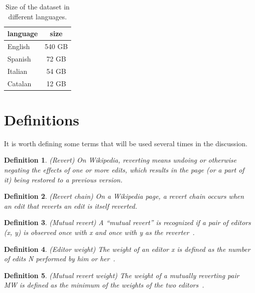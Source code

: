 \begin{table}[H]
    \centering
    \begin{tabularx}{\columnwidth}{@{}Xc@{}}
        \midrule
        \textbf{language} & \textbf{size}\\ \toprule
        English & 540 GB \\
        Spanish & 72 GB \\
        Italian & 54 GB \\
        Catalan & 12 GB \\

         \bottomrule
    \end{tabularx}
    
    \caption{Size of the dataset in different languages. \label{table:datasetsize}}
\end{table}

\section{Definitions}
It is worth defining some terms that will be used several times in the discussion.
\newtheorem{Definition}{Definition}
\begin{Definition}
    (Revert) On Wikipedia, reverting means undoing or otherwise negating the effects of one or more edits,
    which results in the page (or a part of it) being restored to a previous version. %
\end{Definition}

\begin{Definition}
    (Revert chain) On a Wikipedia page, a revert chain occurs when an edit that reverts an edit is itself reverted.
\end{Definition}

\begin{Definition}
    (Mutual revert) A “mutual revert” is recognized if a pair of editors (x, y) is observed once with x and once with y as the reverter~\cite{Yasseri2014}.
\end{Definition}

\begin{Definition}
    (Editor weight) The weight of an editor x is defined as the number of edits N performed by him or her~\cite{Yasseri2014}.
\end{Definition}

\begin{Definition}
    (Mutual revert weight) The weight of a mutually reverting pair MW is defined as the minimum of the weights of the two editors~\cite{Yasseri2014}.
\end{Definition}

